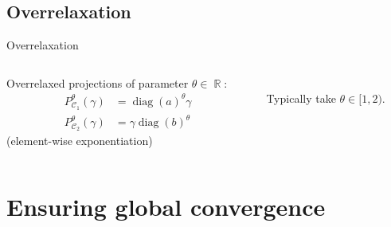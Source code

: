 \documentclass[compress]{beamer}
\DeclareMathOperator{\IR}{\mathbb{R}}
\DeclareMathOperator{\Ccal}{\mathcal{C}}
\DeclareMathOperator{\diag}{diag}
\begin{document}
\subsection{Overrelaxation}
\begin{frame}{Overrelaxation}
	\begin{columns}
		\begin{column}{0.6\textwidth}
			Overrelaxed projections of parameter $\theta \in \IR$:
			\begin{align*}\label{or_scaling}
			P_{\Ccal_1}^\theta(\gamma) &= \diag(a)^\theta \gamma\\
			P_{\Ccal_2}^\theta(\gamma) &= \gamma \diag(b)^\theta \nonumber
			\end{align*}
			(element-wise exponentiation)
		\end{column}
		\begin{column}{0.4\textwidth}
			\centering
			\\
			Typically take $\theta \in [1,2)$.
		\end{column}
	\end{columns}
\end{frame}



\section{Ensuring global convergence}

\end{document}

